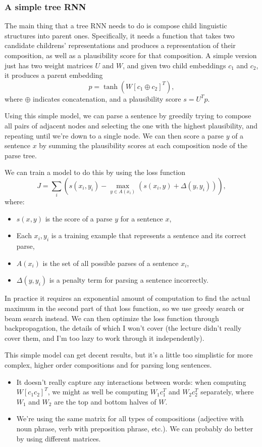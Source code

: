 \subsubsection{A simple tree RNN}
The main thing that a tree RNN needs to do is compose child linguistic structures into parent ones. Specifically, it needs a function that takes two candidate childrens' representations and produces a representation of their composition, as well as a plausibility score for that composition. A simple version just has two weight matrices $U$ and $W$, and given two child embeddings $c_1$ and $c_2$, it produces a parent embedding
$$p = \tanh\left(W\left[c_1 \oplus c_2\right]^T\right),$$
where $\oplus$ indicates concatenation, and a plausibility score $s = U^Tp$.

Using this simple model, we can parse a sentence by greedily trying to compose all pairs of adjacent nodes and selecting the one with the highest plausibility, and repeating until we're down to a single node. We can then score a parse $y$ of a sentence $x$ by summing the plausibility scores at each composition node of the parse tree.

We can train a model to do this by using the loss function
$$J = \sum_i\left( s(x_i, y_i) - \max_{y \in A(x_i)}\left(s(x_i, y) + \Delta(y, y_i)\right)\right),$$
where:
\begin{itemize}
\item $s(x, y)$ is the score of a parse $y$ for a sentence $x$,
\item Each $x_i, y_i$ is a training example that represents a sentence and its correct parse,
\item $A(x_i)$ is the set of all possible parses of a sentence $x_i$,
\item $\Delta(y, y_i)$ is a penalty term for parsing a sentence incorrectly.
\end{itemize}
In practice it requires an exponential amount of computation to find the actual maximum in the second part of that loss function, so we use greedy search or beam search instead. We can then optimize the loss function through backpropagation, the details of which I won't cover (the lecture didn't really cover them, and I'm too lazy to work through it independently).

This simple model can get decent results, but it's a little too simplistic for more complex, higher order compositions and for parsing long sentences.
\begin{itemize}
\item It doesn't really capture any interactions between words: when computing $W\left[c_1 c_2\right]^T$, we might as well be computing $W_1c_1^T$ and $W_2c_2^T$ separately, where $W_1$ and $W_2$ are the top and bottom halves of $W$.
\item We're using the same matrix for all types of compositions (adjective with noun phrase, verb with preposition phrase, etc.). We can probably do better by using different matrices.
\end{itemize}

